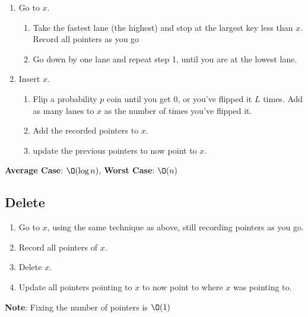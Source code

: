 \documentclass[12pt, letterpaper]{article}
\begin{document}
\begin{multicols*}{3}
        \begin{enumerate}
            \item Go to $x$.
            \begin{enumerate}[label=\roman*.]
                \item Take the fastest lane (the highest) and stop at the largest key less than $x$. Record all pointers as you go
                \item Go down by one lane and repeat step 1, until you are at the lowest lane.
            \end{enumerate}
            \item Insert $x$. %
            \begin{enumerate}[label=\roman*.]
                \item Flip a probability $p$ coin until you get $0$, or you've flipped it $L$ times.
                Add as many lanes to $x$ as the number of times you've flipped it.
                
                \item Add the recorded pointers to $x$.

                \item update the previous pointers to now point to $x$.
            \end{enumerate}
        \end{enumerate}

        {\bf Average Case}: $\O(\log n)$, {\bf Worst Case}: $\O(n)$

        

        \subsection{Delete}

        \begin{enumerate}
            \item Go to $x$, using the same technique as above, still recording pointers as you go.
            \item Record all pointers of $x$.
            \item Delete $x$.
            \item Update all pointers pointing to $x$ to now point to where $x$ was pointing to.
        \end{enumerate}

        {\bf Note}: Fixing the number of pointers is $\O(1)$


\end{multicols*}
\end{document}
